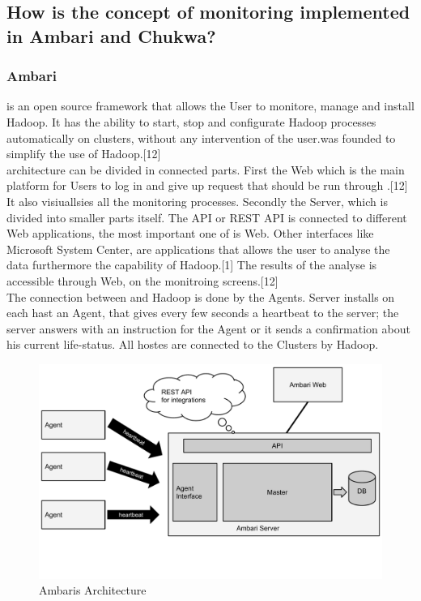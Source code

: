 \subsection{How is the concept of monitoring implemented in Ambari and Chukwa?}
\label{subsec:Implementation}

\subsubsection{Ambari}
\amb is an open source framework that allows the User to monitore, manage and install Hadoop.\cite{ChukwaPoster} It has the ability to start, stop and configurate Hadoop processes automatically on clusters, without any intervention of the user.\amb was founded to simplify the use of Hadoop.[12]
\\
\amb architecture can be divided in connected parts. First the \amb Web which is the main platform for Users to log in and give up request that should be run through \amb.[12] It also visiuallsies all the monitoring processes. Secondly the \amb Server, which is divided into smaller parts itself. The API or REST API is connected to different Web applications, the most important one of is \amb Web. Other interfaces like Microsoft System Center, are applications that allows the user to analyse the data furthermore the capability of Hadoop.[1] The results of the analyse is accessible through \amb Web, on the monitroing screens.[12]
\\
The connection between \amb and Hadoop is done by the \amb Agents. \amb Server installs on each hast an \amb Agent, that gives every few seconds a heartbeat to the server; the server answers with an instruction for the Agent or it sends a confirmation about his current life-status. All hostes are connected to the Clusters by Hadoop.
\\
\begin{figure}[hbt]
  \centering
  \includegraphics[width=\linewidth,clip=true,trim=0 3cm 0 0]{images/AmbariArchitecture}
  \caption{Ambaris Architecture~\cite{Sako}}
  \label{fig:AmbariArchitecture}
\end{figure}

